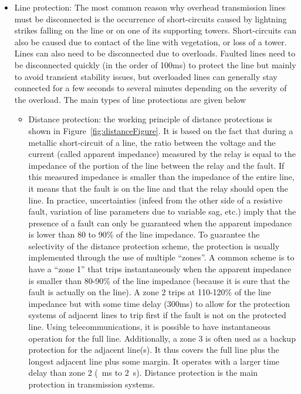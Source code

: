 \begin{itemize}
    \item Line protection: The most common reason why overhead transmission lines must be disconnected is the occurrence of short-circuits caused by lightning strikes falling on the line or on one of its supporting towers. Short-circuits can also be caused due to contact of the line with vegetation, or loss of a tower. Lines can also need to be disconnected due to overloads. Faulted lines need to be disconnected quickly (in the order of 100ms) to protect the line but mainly to avoid transient stability issues, but overloaded lines can generally stay connected for a few seconds to several minutes depending on the severity of the overload. The main types of line protections are given below
    \begin{itemize}
        \item Distance protection: the working principle of distance protections is shown in Figure~\ref{fig:distanceFigure}. It is based on the fact that during a metallic short-circuit of a line, the ratio between the voltage and the current (called apparent impedance) measured by the relay is equal to the impedance of the portion of the line between the relay and the fault. If this measured impedance is smaller than the impedance of the entire line, it means that the fault is on the line and that the relay should open the line. In practice, uncertainties (infeed from the other side of a resistive fault, variation of line parameters due to variable sag, etc.) imply that the presence of a fault can only be guaranteed when the apparent impedance is lower than 80 to 90\% of the line impedance. To guarantee the selectivity of the distance protection scheme, the protection is usually implemented through the use of multiple ``zones''. A common scheme is to have a ``zone 1'' that trips instantaneously when the apparent impedance is smaller than 80-90\% of the line impedance (because it is sure that the fault is actually on the line). A zone 2 trips at 110-120\% of the line impedance but with some time delay (\eg 300ms) to allow for the protection systems of adjacent lines to trip first if the fault is not on the protected line. Using telecommunications, it is possible to have instantaneous operation for the full line. Additionally, a zone 3 is often used as a backup protection for the adjacent line(s). It thus covers the full line plus the longest adjacent line plus some margin. It operates with a larger time delay than zone 2 (~ms to 2~s). Distance protection is the main protection in transmission systems.

\end{itemize}
\end{itemize}
